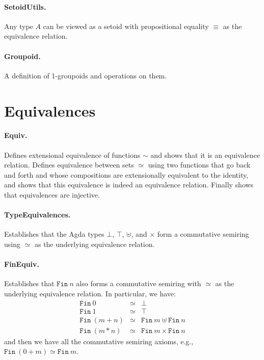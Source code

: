 \documentclass{article}
\begin{document}
\paragraph*{SetoidUtils.} Any type $A$ can be viewed as a setoid with propositional equality $\equiv$ as the equivalence relation.

\paragraph*{Groupoid.} A definition of 1-groupoids and operations on them.

\section{Equivalences} 

\paragraph*{Equiv.} Defines extensional equivalence of functions $\sim$ and shows that it is an equivalence relation. Defines equivalence between sets $\simeq$ using two functions that go back and forth and whose compositions are extensionally equivalent to the identity, and shows that this equivalence is indeed an equivalence relation. Finally shows that equivalences are injective.

\paragraph*{TypeEquivalences.} Establishes that the Agda types $\bot$, $\top$, $\uplus$, and $\times$ form a commutative semiring using $\simeq$ as the underlying equivalence relation.

\paragraph*{FinEquiv.} Establishes that $\texttt{Fin}~n$ also forms a commutative semiring with $\simeq$ as the underlying equivalence relation. In particular, we have:
\[\begin{array}{rcll}
\texttt{Fin}~0 &\simeq& \bot \\
\texttt{Fin}~1 &\simeq& \top \\
\texttt{Fin}~(m+n) &\simeq& \texttt{Fin}~m \uplus \texttt{Fin}~n \\
\texttt{Fin}~(m*n) &\simeq& \texttt{Fin}~m \times \texttt{Fin}~n
\end{array}\]
and then we have all the commutative semiring axioms, e.g., $\texttt{Fin}~(0+m) \simeq \texttt{Fin}~m$. 
\end{document}
